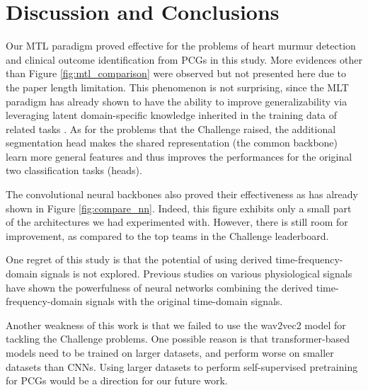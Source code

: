 \section{Discussion and Conclusions}
\label{sec:discu}

Our MTL paradigm proved effective for the problems of heart murmur detection and clinical outcome identification from PCGs in this study. More evidences other than Figure \ref{fig:mtl_comparison} were observed but not presented here due to the paper length limitation. This phenomenon is not surprising, since the MLT paradigm has already shown to have the ability to improve generalizability via leveraging latent domain-specific knowledge inherited in the training data of related tasks \cite{Caruana_1997_mtl}. As for the problems that the Challenge raised, the additional segmentation head makes the shared representation (the common backbone) learn more general features and thus improves the performances for the original two classification tasks (heads).

The convolutional neural backbones also proved their effectiveness as has already shown in Figure \ref{fig:compare_nn}. Indeed, this figure exhibits only a small part of the architectures we had experimented with. However, there is still room for improvement, as compared to the top teams in the Challenge leaderboard.

One regret of this study is that the potential of using derived time-frequency-domain signals is not explored. Previous studies on various physiological signals have shown the powerfulness of neural networks combining the derived time-frequency-domain signals with the original time-domain signals.

Another weakness of this work is that we failed to use the wav2vec2 model for tackling the Challenge problems. One possible reason is that transformer-based models need to be trained on larger datasets, and perform worse on smaller datasets than CNNs. Using larger datasets to perform self-supervised pretraining for PCGs would be a direction for our future work.
